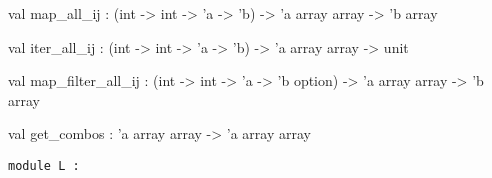 \documentclass[11pt]{article}
\begin{document}
\begin{ocamldocsigend}
\label{val:Util.A.map-underscoreall-underscoreij}\begin{ocamldoccode}
val map_all_ij : (int -> int -> 'a -> 'b) -> 'a array array -> 'b array
\end{ocamldoccode}


\label{val:Util.A.iter-underscoreall-underscoreij}\begin{ocamldoccode}
val iter_all_ij : (int -> int -> 'a -> 'b) -> 'a array array -> unit
\end{ocamldoccode}


\label{val:Util.A.map-underscorefilter-underscoreall-underscoreij}\begin{ocamldoccode}
val map_filter_all_ij :
  (int -> int -> 'a -> 'b option) -> 'a array array -> 'b array
\end{ocamldoccode}


\label{val:Util.A.get-underscorecombos}\begin{ocamldoccode}
val get_combos : 'a array array -> 'a array array
\end{ocamldoccode}
\end{ocamldocsigend}






\begin{ocamldoccode}
{\tt{module }}{\tt{L}}{\tt{ : }}\end{ocamldoccode}
\label{module:Util.L}
\end{document}
